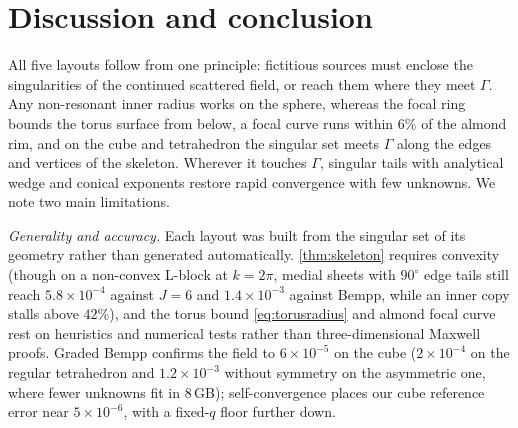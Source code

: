 \section{Discussion and conclusion}
\label{sec:conclusion}

All five layouts follow from one principle: fictitious sources must enclose the singularities of the continued scattered field, or reach them where they meet $\Gamma$. Any non-resonant inner radius works on the sphere, whereas the focal ring bounds the torus surface from below, a focal curve runs within $6\%$ of the almond rim, and on the cube and tetrahedron the singular set meets $\Gamma$ along the edges and vertices of the skeleton. Wherever it touches $\Gamma$, singular tails with analytical wedge and conical exponents restore rapid convergence with few unknowns. We note two main limitations.

\emph{Generality and accuracy.} Each layout was built from the singular set of its geometry rather than generated automatically. \autoref{thm:skeleton} requires convexity (though on a non-convex L-block at $k = 2\pi$, medial sheets with $90^\circ$ edge tails still reach $5.8\times10^{-4}$ against $J = 6$ and $1.4\times10^{-3}$ against Bempp, while an inner copy stalls above $42\%$), and the torus bound \eqref{eq:torusradius} and almond focal curve rest on heuristics and numerical tests rather than three-dimensional Maxwell proofs. Graded Bempp confirms the field to $6\times10^{-5}$ on the cube ($2\times10^{-4}$ on the regular tetrahedron and $1.2\times10^{-3}$ without symmetry on the asymmetric one, where fewer unknowns fit in $8$\,GB); self-convergence places our cube reference error near $5\times10^{-6}$, with a fixed-$q$ floor further down.

